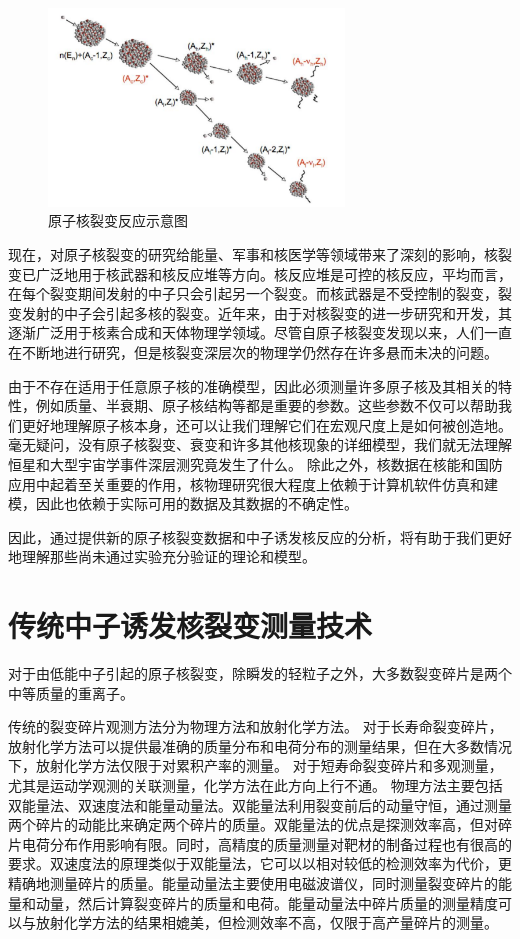 \documentclass[AutoFakeBold]{LZUThesis}
\begin{document}
\begin{figure}[H]
    \centering
    \includegraphics[width=0.7\textwidth]{figures/nuclear_fission.png}
    \caption{原子核裂变反应示意图\cite{kovacs1970angular}}
    \label{fig_nuclear_fission}
\end{figure}

现在，对原子核裂变的研究给能量、军事和核医学等领域带来了深刻的影响，核裂变已广泛地用于核武器和核反应堆等方向。核反应堆是可控的核反应，平均而言，在每个裂变期间发射的中子只会引起另一个裂变。而核武器是不受控制的裂变，裂变发射的中子会引起多核的裂变。近年来，由于对核裂变的进一步研究和开发，其逐渐广泛用于核素合成和天体物理学领域。尽管自原子核裂变发现以来，人们一直在不断地进行研究，但是核裂变深层次的物理学仍然存在许多悬而未决的问题。


由于不存在适用于任意原子核的准确模型，因此必须测量许多原子核及其相关的特性，例如质量、半衰期、原子核结构等都是重要的参数。这些参数不仅可以帮助我们更好地理解原子核本身，还可以让我们理解它们在宏观尺度上是如何被创造地。毫无疑问，没有原子核裂变、衰变和许多其他核现象的详细模型，我们就无法理解恒星和大型宇宙学事件深层测究竟发生了什么。
除此之外，核数据在核能和国防应用中起着至关重要的作用，核物理研究很大程度上依赖于计算机软件仿真和建模，因此也依赖于实际可用的数据及其数据的不确定性。


因此，通过提供新的原子核裂变数据和中子诱发核反应的分析，将有助于我们更好地理解那些尚未通过实验充分验证的理论和模型\cite{bohr1939mechanism}。





\section{传统中子诱发核裂变测量技术}
对于由低能中子引起的原子核裂变，除瞬发的轻粒子之外，大多数裂变碎片是两个中等质量的重离子。

传统的裂变碎片观测方法分为物理方法和放射化学方法。
对于长寿命裂变碎片，放射化学方法可以提供最准确的质量分布和电荷分布的测量结果，但在大多数情况下，放射化学方法仅限于对累积产率的测量。
对于短寿命裂变碎片和多观测量，尤其是运动学观测的关联测量，化学方法在此方向上行不通。
物理方法主要包括双能量法、双速度法和能量动量法。双能量法利用裂变前后的动量守恒，通过测量两个碎片的动能比来确定两个碎片的质量。双能量法的优点是探测效率高，但对碎片电荷分布作用影响有限。同时，高精度的质量测量对靶材的制备过程也有很高的要求。双速度法的原理类似于双能量法，它可以以相对较低的检测效率为代价，更精确地测量碎片的质量。能量动量法主要使用电磁波谱仪，同时测量裂变碎片的能量和动量，然后计算裂变碎片的质量和电荷。能量动量法中碎片质量的测量精度可以与放射化学方法的结果相媲美，但检测效率不高，仅限于高产量碎片的测量。
\end{document}
